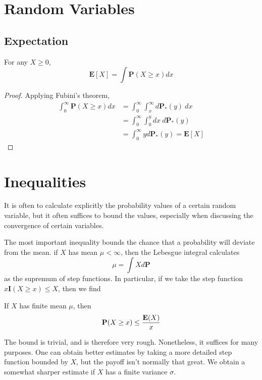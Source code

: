 \chapter{Random Variables}

\section{Expectation}

\begin{theorem}
    For any $X \geq 0$,
    \[ \mathbf{E}[X] = \int \mathbf{P}(X \geq x) dx \]
\end{theorem}
\begin{proof}
    Applying Fubini's theorem,
    \begin{align*}
        \int_0^\infty \mathbf{P}(X \geq x) dx &= \int_0^\infty \int_x^\infty d \mathbf{P}_*(y)\ dx\\
        &= \int_0^\infty \int_0^y dx\ d\mathbf{P}_*(y)\\
        &= \int_0^\infty y d\mathbf{P}_*(y) = \mathbf{E}[X]
    \end{align*}
\end{proof}

\chapter{Inequalities}

It is often to calculate explicitly the probability values of a certain random variable, but it often suffices to bound the values, especially when discussing the convergence of certain variables.

The most important inequality bounds the chance that a probability will deviate from the mean. if $X$ has mean $\mu < \infty$, then the Lebesgue integral calculates
%
\[ \mu = \int X d\mathbf{P} \]
%
as the supremum of step functions. In particular, if we take the step function $x \mathbf{I}(X \geq x) \leq X$, then we find

\begin{theorem}
    If $X$ has finite mean $\mu$, then
    \[ \operatorname{\mathbf{P}}(X \geq x) \leq \frac{\mathbf{E}(X)}{x} \]
\end{theorem}

The bound is trivial, and is therefore very rough. Nonetheless, it suffices for many purposes. One can obtain better estimates by taking a more detailed step function bounded by $X$, but the payoff isn't normally that great. We obtain a somewhat sharper estimate if $X$ has a finite variance $\sigma$.

